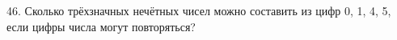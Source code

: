 46. Сколько трёхзначных нечётных чисел можно составить из цифр 0, 1, 4, 5, если цифры числа могут повторяться?\\
